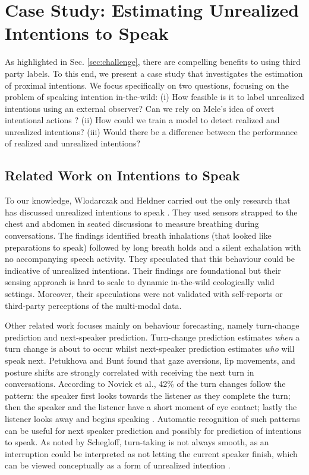 \documentclass[sigconf]{acmart}
\begin{document}
\section{Case Study: Estimating Unrealized Intentions to Speak} \label{sec:case}
As highlighted in Sec. \ref{sec:challenge}, there are compelling benefits to using third party labels. To this end, we present a case study that investigates the estimation of proximal intentions. We focus specifically on two questions, focusing on the problem of speaking intention in-the-wild: (i) How feasible is it to label unrealized intentions using an external observer? Can we rely on Mele's idea of overt intentional actions \cite{mele1992springs}? (ii) How could we train a model to detect realized and unrealized intentions? (iii) Would there be a difference between the performance of realized and unrealized intentions?
\subsection{Related Work on Intentions to Speak}
To our knowledge, Wlodarczak and Heldner carried out the only research that has discussed unrealized intentions to speak \cite{wlodarczak2020breathing}. They used sensors strapped to the chest and abdomen in seated discussions to measure breathing during conversations. The findings identified breath inhalations (that looked like preparations to speak) followed by long breath holds and a silent exhalation with no accompanying speech activity. They speculated that this behaviour could be indicative of unrealized intentions. Their findings are foundational but their sensing approach is hard to scale to dynamic in-the-wild ecologically valid settings. Moreover, their speculations were not validated with self-reports or third-party perceptions of the multi-modal data. 

Other related work focuses mainly on behaviour forecasting, namely turn-change prediction and next-speaker prediction. Turn-change prediction estimates \emph{when} a turn change is about to occur whilst next-speaker prediction estimates \emph{who} will speak next. Petukhova and Bunt \cite{whosnext} found that gaze aversions, lip movements, and posture shifts are strongly correlated with receiving the next turn in conversations. According to Novick et al., 42\% of the turn changes follow the pattern: the speaker first looks towards the listener as they complete the turn; then the speaker and the listener have a short moment of eye contact; lastly the listener looks away and begins speaking \cite{novick_gaze}. Automatic recognition of such patterns can be useful for next speaker prediction and possibly for prediction of intentions to speak. As noted by Schegloff, turn-taking is not always smooth, as an interruption could be interpreted as not letting the current speaker finish, which can be viewed conceptually as a form of unrealized intention \cite{schegloff2001accounts}.
\end{document}
